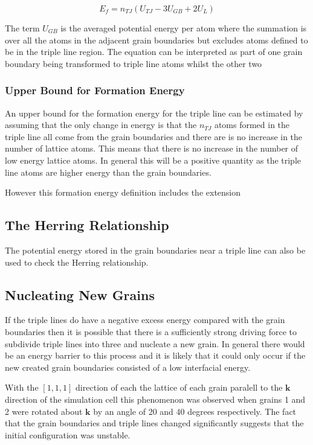 \documentclass[12pt,a4paper]{book}
\begin{document}
\[ E_{f} = n_{TJ}\left(U_{TJ} -3U_{GB} + 2U_{L} \right) \]

The term $U_{GB}$ is the averaged potential energy per atom where the summation is over all the atoms in the adjacent grain boundaries but excludes atoms defined to be in the triple line region. The equation can be interpreted as part of one grain boundary being transformed to triple line atoms whilst the other two     

\subsubsection{Upper Bound for Formation Energy}

An upper bound for the formation energy for the triple line can be estimated by assuming that the only change in energy is that the  $n_{TJ}$ atoms formed in the triple line all come from the grain boundaries and there are is no increase in the number of lattice atoms. This means that there is no increase in the number of low energy lattice atoms. In general this will be a positive quantity as the triple line atoms are higher energy than the grain boundaries. 

However this formation energy definition includes the extension  


\subsection{The Herring Relationship}

The potential energy stored in the grain boundaries near a triple line can also be used to check the Herring relationship.

\subsection{Nucleating New Grains}

If the triple lines do have a negative excess energy compared with the grain boundaries then it is possible that there is a sufficiently strong driving force to subdivide triple lines into three and nucleate a new grain. In general there would be an energy barrier to this process and it is likely that it could only occur if the new created grain boundaries consisted of a low interfacial energy.

With the $[1,1,1]$ direction of each the lattice of each grain paralell to the $\mathbf{k}$ direction of the simulation cell this phenomenon was observed when grains 1 and 2 were rotated about $\mathbf{k}$  by an angle of 20 and 40 degrees respectively. The fact that the grain boundaries and triple lines changed significantly suggests that the initial configuration was unstable. 
\end{document}
